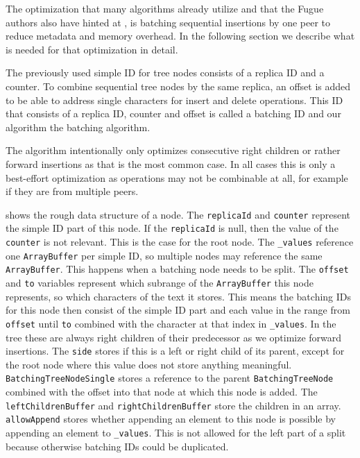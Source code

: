 The optimization that many algorithms already utilize and that the Fugue authors also have hinted at \cite[Section 5]{2023-weidner-minimizing-interleaving}, is batching sequential insertions by one peer to reduce metadata and memory overhead. In the following section we describe what is needed for that optimization in detail.

The previously used \gls{simple ID} for tree nodes consists of a replica ID and a counter. To combine sequential tree nodes by the same replica, an offset is added to be able to address single characters for insert and delete operations. This ID that consists of a replica ID, counter and offset is called a \gls{batching ID} and our algorithm the \gls{batching algorithm}.

The algorithm intentionally only optimizes consecutive right children or rather forward insertions as that is the most common case. In all cases this is only a best-effort optimization as operations may not be combinable at all, for example if they are from multiple peers.

 shows the rough data structure of a node. The \texttt{replicaId} and \texttt{counter} represent the \gls{simple ID} part of this node. If the \texttt{replicaId} is null, then the value of the \texttt{counter} is not relevant. This is the case for the root node. The \texttt{\_values} reference one \texttt{ArrayBuffer} per \gls{simple ID}, so multiple nodes may reference the same \texttt{ArrayBuffer}. This happens when a batching node needs to be split. The \texttt{offset} and \texttt{to} variables represent which subrange of the \texttt{ArrayBuffer} this node represents, so which characters of the text it stores. This means the \gls{batching ID}s for this node then consist of the \gls{simple ID} part and each value in the range from \texttt{offset} until \texttt{to} combined with the character at that index in \texttt{\_values}. In the tree these are always right children of their predecessor as we optimize forward insertions. The \texttt{side} stores if this is a left or right child of its parent, except for the root node where this value does not store anything meaningful. \texttt{BatchingTreeNodeSingle} stores a reference to the parent \texttt{BatchingTreeNode} combined with the offset into that node at which this node is added. The \texttt{leftChildrenBuffer} and \texttt{rightChildrenBuffer} store the children in an array. \texttt{allowAppend} stores whether appending an element to this node is possible by appending an element to \texttt{\_values}. This is not allowed for the left part of a split because otherwise \glspl{batching ID} could be duplicated.


